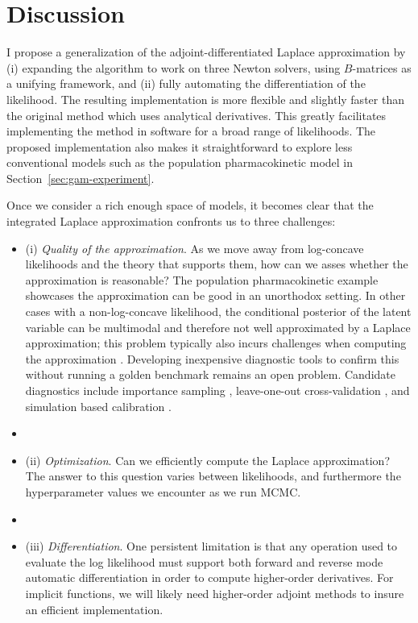 \documentclass[stslayout, noinfoline]{imsart}
\theoremstyle{definition}
\begin{document}
\section{Discussion}

I propose a generalization of the adjoint-differentiated Laplace approximation by (i) expanding the algorithm to work on three Newton solvers, using $B$-matrices as a unifying framework, and (ii) fully automating the differentiation of the likelihood.
The resulting implementation is more flexible and slightly faster than the original method
which uses analytical derivatives.
This greatly facilitates implementing the method in software for a broad range of likelihoods.
%
The proposed implementation also makes it straightforward to explore less conventional models
such as the population pharmacokinetic model in Section~\ref{sec:gam-experiment}.

Once we consider a rich enough space of models, it becomes clear that the integrated Laplace approximation confronts us to three challenges:
\begin{itemize}
  \item[] (i) \textit{Quality of the approximation}. As we move away from log-concave likelihoods and the theory that supports them, how can we asses whether the approximation is reasonable?
  The population pharmacokinetic example showcases the approximation can be good in an unorthodox setting.
  In other cases with a non-log-concave likelihood, the conditional posterior of the latent variable can be multimodal and therefore not well approximated by a Laplace approximation;
  this problem typically also incurs challenges when computing the approximation
  \citep[e.g.][]{Vanhatalo:2009}.
  Developing inexpensive diagnostic tools to confirm this without running a golden benchmark remains an open problem.
  Candidate diagnostics include importance sampling \citep{Vehtari+etal:2019:psis}, 
  leave-one-out cross-validation \citep{Vehtari+etal:2016:loo_glvm}, and simulation based calibration \citep{Talts:2018}.
  \item[]
  \item[] (ii) \textit{Optimization}. Can we efficiently compute the Laplace approximation? The answer to this question varies between likelihoods, and furthermore the hyperparameter values we encounter as we run MCMC.
  \item[]
  \item[] (iii) \textit{Differentiation}. One persistent limitation is that any operation used to evaluate the log likelihood must support both forward and reverse mode automatic differentiation in order to compute higher-order derivatives.
For implicit functions, we will likely need higher-order adjoint methods to insure an efficient implementation.
\end{itemize}
\end{document}
